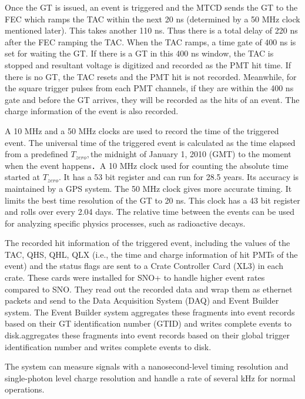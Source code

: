 Once the GT is issued, an event is triggered and the MTCD sends the GT to the FEC which ramps the TAC within the next 20 ns (determined by a 50 MHz clock mentioned later). This takes another 110 ns. Thus there is a total delay of 220 ns after the FEC ramping the TAC. When the TAC ramps, a time gate of 400 ns is set for waiting the GT. If there is a GT in this 400 ns window, the TAC is stopped and resultant voltage is digitized and recorded as the PMT hit time. If there is no GT, the TAC resets and the PMT hit is not recorded. Meanwhile, for the square trigger pulses from each PMT channels, if they are within the 400 ns gate and before the GT arrives, they will be recorded as the hits of an event. The charge information of the event is also recorded\cite{stringer2019sensitivity,rattime}.

A 10 MHz and a 50 MHz clocks are used to record the time of the triggered event. The universal time of the triggered event is calculated as the time elapsed from a predefined $T_{zero}, $the midnight of January 1, 2010 (GMT) to the moment when the event happens．A 10 MHz clock used for counting the absolute time started at $T_{zero}$. It has a 53 bit register and can run for 28.5 years. Its accuracy is maintained by a GPS system. The 50 MHz clock gives more accurate timing. It limits the best time resolution of the GT to 20 ns. This clock has a 43 bit register and rolls over every 2.04 days. The relative time between the events can be used for analyzing specific physics processes, such as radioactive decays\cite{rattime,stringer2019sensitivity}. 

The recorded hit information of the triggered event, including the values of the TAC, QHS, QHL, QLX (i.e., the time and charge information of hit PMTs of the event) and the status flags are sent to a Crate Controller Card (XL3) in each crate. These cards were installed for SNO+ to handle higher event rates compared to SNO. They read out the recorded data and wrap them as ethernet packets and send to the Data Acquisition System (DAQ) and Event Builder system\cite{walker2016study}. The Event Builder system aggregates these fragments into event records based on their GT identification number (GTID) and
writes complete events to disk.aggregates these fragments into event records based on their global trigger identification number and
writes complete events to disk\cite{snop_nim}.


The system can measure signals with a nanosecond-level timing resolution and single-photon level charge resolution and handle a rate of several kHz for normal operations. 


